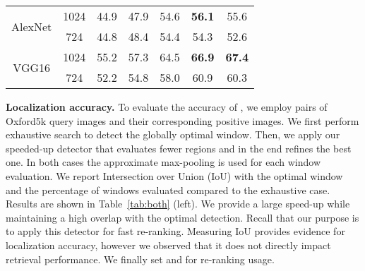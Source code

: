 \begin{table}
\begin{minipage}{0.49\textwidth}
\begin{tabular}{|@{\ssp}c@{\ssp}|@{\ssp}c@{\ssp}|@{\ssp}c@{\ssp}|c@{\bsp}c@{\bsp}c@{\bsp}c|}
\multirow{2}{*}{AlexNet} &					 1024					 & 		 								 			44.9 						&       47.9    &     54.6   &     \textbf{56.1}  &       55.6   \\
												 &            724 			   & 										       44.8            &       48.4    &     54.4   &     54.3  &       52.6   \\
\hline
\multirow{2}{*}{VGG16}   & 					 1024          &                           55.2            &       57.3    &     64.5   &     \textbf{66.9}  &       \textbf{67.4}   \\
		                     &            724          &                        52.2            &       54.8    &     58.0   &     60.9  &       60.3   \\
\hline
\end{tabular}
\end{minipage}
\vspace{2ex}
\end{table}

\textbf{Localization accuracy.}
To evaluate the accuracy of \deeploc, we employ pairs of Oxford5k query images and their corresponding positive images.
We first perform exhaustive search to detect the globally optimal window.
Then, we apply our speeded-up detector that evaluates fewer regions and in the end refines the best one.
In both cases the approximate max-pooling is used for each window evaluation.
We report Intersection over Union (IoU) with the optimal window and the percentage of windows evaluated compared to the exhaustive case.
Results are shown in Table~\ref{tab:both} (left).
We provide a large speed-up while maintaining a high overlap with the optimal detection.
Recall that our purpose is to apply this detector for fast re-ranking.
Measuring IoU provides evidence for localization accuracy, however we observed that it does not directly impact retrieval performance.
We finally set  and  for re-ranking usage.

